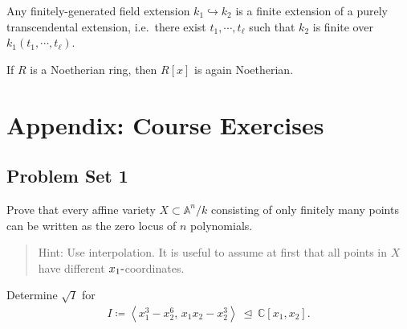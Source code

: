 \begin{theorem}\label{thm:noether_normalization}

Any finitely-generated field extension \(k_1 \hookrightarrow k_2\) is a
finite extension of a purely transcendental extension, i.e.~there exist
\(t_1, \cdots, t_\ell\) such that \(k_2\) is finite over
\(k_1(t_1, \cdots, t_\ell)\).

\end{theorem}

\begin{theorem}\label{thm:hilbert_basis}

If \(R\) is a Noetherian ring, then \(R[x]\) is again Noetherian.

\end{theorem}

\hypertarget{appendix-course-exercises}{%
\section{Appendix: Course Exercises}\label{appendix-course-exercises}}

\hypertarget{problem-set-1}{%
\subsection{Problem Set 1}\label{problem-set-1}}

\begin{exercise}[Gathmann 1.19]

Prove that every affine variety \(X\subset {\mathbb{A}}^n/k\) consisting
of only finitely many points can be written as the zero locus of \(n\)
polynomials.

\begin{quote}
Hint: Use interpolation. It is useful to assume at first that all points
in \(X\) have different \(x_1{\hbox{-}}\)coordinates.
\end{quote}

\end{exercise}

\begin{exercise}[Gathmann 1.21]

Determine \(\sqrt{I}\) for
\begin{align*}  
I\coloneqq\left\langle{x_1^3 - x_2^6,\, x_1 x_2 - x_2^3}\right\rangle {~\trianglelefteq~}{\mathbb{C}}[x_1, x_2]
.\end{align*}

\end{exercise}

